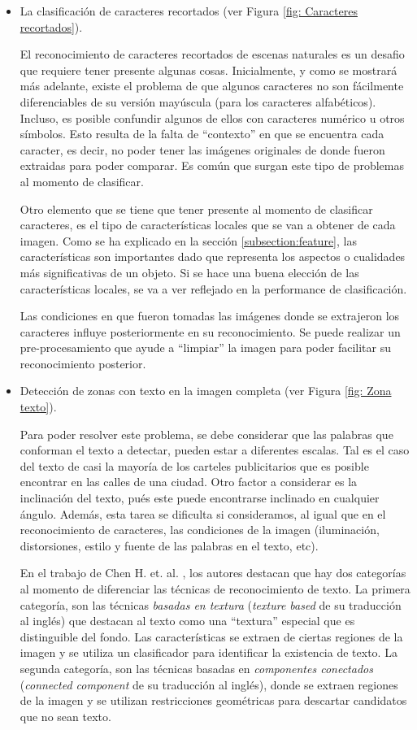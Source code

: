 	\begin{itemize}
		\item La clasificación de caracteres recortados (ver Figura \ref{fig: Caracteres recortados}).
		
		El reconocimiento de caracteres recortados de escenas naturales es un desafio que requiere tener presente algunas cosas. Inicialmente, y como se mostrará más adelante, existe el problema de que algunos caracteres no son fácilmente diferenciables de su versión mayúscula (para los caracteres alfabéticos). Incluso, es posible confundir algunos de ellos con caracteres numérico u otros símbolos. Esto resulta de la falta de ``contexto'' en que se encuentra cada caracter, es decir, no poder tener las imágenes originales de donde fueron extraidas para poder comparar. Es común que surgan este tipo de problemas al momento de clasificar.
				
		Otro elemento que se tiene que tener presente al momento de clasificar caracteres, es el tipo de características locales que se van a obtener de cada imagen. Como se ha explicado en la sección \ref{subsection:feature}, las características son importantes dado que representa los aspectos o cualidades más significativas de un objeto. Si se hace una buena elección de las características locales, se va a ver reflejado en la performance de clasificación.
		
		Las condiciones en que fueron tomadas las imágenes donde se extrajeron los caracteres influye posteriormente en su reconocimiento. Se puede realizar un pre-procesamiento que ayude a ``limpiar'' la imagen para poder facilitar su reconocimiento posterior.
		
		\item Detección de zonas con texto en la imagen completa (ver Figura \ref{fig: Zona texto}).
		
		Para poder resolver este problema, se debe considerar que las palabras que conforman el texto a detectar, pueden estar a diferentes escalas. Tal es el caso del texto de casi la mayoría de los carteles publicitarios que es posible encontrar en las calles de una ciudad. Otro factor a considerar es la inclinación del texto, pués este puede encontrarse inclinado en cualquier ángulo. Además, esta tarea se dificulta si consideramos, al igual que en el reconocimiento de caracteres, las condiciones de la imagen (iluminación, distorsiones, estilo y fuente de las palabras en el texto, etc).
		
		En el trabajo de Chen H. et. al. \cite{ChenH11}, los autores destacan que hay dos categorías al momento de diferenciar las técnicas de reconocimiento de texto. La primera categoría, son las técnicas \textit{basadas en textura} (\textit{texture based} de su traducción al inglés) que destacan al texto como una ``textura'' especial que es distinguible del fondo. Las características se extraen de ciertas regiones de la imagen y se utiliza un clasificador para identificar la existencia de texto. La segunda categoría, son las técnicas basadas en \textit{componentes conectados} (\textit{connected component} de su traducción al inglés), donde se extraen regiones de la imagen y se utilizan restricciones geométricas para descartar candidatos que no sean texto.
		

\end{itemize}
